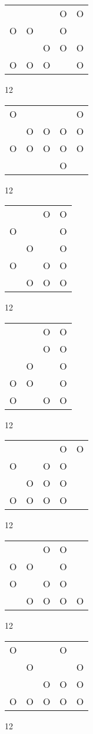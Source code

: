 \begin{tabular}{|m{0.2cm}m{0.2cm}m{0.2cm}m{0.2cm}m{0.2cm}|}\hline
 & & &O&O\\
O&O& &O& \\
 & &O&O&O\\
O&O&O& &O\\
\hline\end{tabular}12
\begin{tabular}{|m{0.2cm}m{0.2cm}m{0.2cm}m{0.2cm}m{0.2cm}|}\hline
O& & & &O\\
 &O&O&O&O\\
O&O&O&O&O\\
 & & &O& \\
\hline\end{tabular}12
\begin{tabular}{|m{0.2cm}m{0.2cm}m{0.2cm}m{0.2cm}|}\hline
 & &O&O\\
O& & &O\\
 &O& &O\\
O& &O&O\\
 &O&O&O\\
\hline\end{tabular}12
\begin{tabular}{|m{0.2cm}m{0.2cm}m{0.2cm}m{0.2cm}|}\hline
 & &O&O\\
 & &O&O\\
 &O& &O\\
O&O& &O\\
O& &O&O\\
\hline\end{tabular}12
\begin{tabular}{|m{0.2cm}m{0.2cm}m{0.2cm}m{0.2cm}m{0.2cm}|}\hline
 & & &O&O\\
O& &O&O& \\
 &O&O&O& \\
O&O&O&O& \\
\hline\end{tabular}12
\begin{tabular}{|m{0.2cm}m{0.2cm}m{0.2cm}m{0.2cm}m{0.2cm}|}\hline
 & &O&O& \\
O&O& &O& \\
O& &O&O& \\
 &O&O&O&O\\
\hline\end{tabular}12
\begin{tabular}{|m{0.2cm}m{0.2cm}m{0.2cm}m{0.2cm}m{0.2cm}|}\hline
O& & &O& \\
 &O& & &O\\
 & &O&O&O\\
O&O&O&O&O\\
\hline\end{tabular}12
